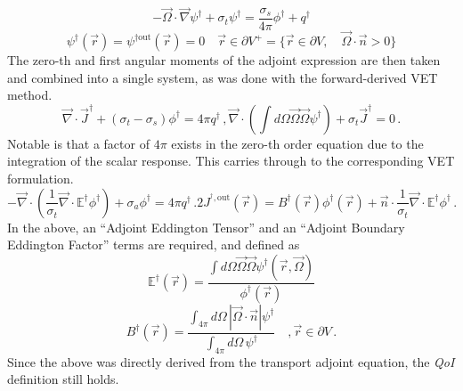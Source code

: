 \documentclass[12pt]{report}
\newcommand{\vr}{\vec{r}}
\newcommand{\vO}{\vec{\Omega}}
\renewcommand{\div}{\vec{\nabla} \cdot}
\newcommand{\grad}{\vec{\nabla}}
\newcommand{\bound}{\partial V}
\newcommand{\vn}{\vec{n}}
\newcommand{\Edd}{\mathbb{E}}
\newcommand{\BEdd}{B}
\newcommand{\sigt}{\sigma_t}
\newcommand{\sigs}{\sigma_s}
\newcommand{\siga}{\sigma_a}
\newcommand{\scalResp}{q^\dag}
\newcommand{\qoi}{{\it QoI}\xspace}
\begin{document}
\begin{equation}
\label{snAdjAlt}
- \vO \cdot \grad \psi^\dag + \sigt \psi^\dag = \frac{\sigs}{4 \pi} \phi^\dag + \scalResp
\end{equation}
%
\begin{equation}
\psi^\dag(\vr) = \psi^{\dag \text{out}}(\vr)=0 \quad \vr \in \partial V^{+} = \{  \vr \in \bound , \quad \vO \cdot \vec{n} > 0 \}
\end{equation}
The zero-th and first angular moments of the adjoint expression are then taken and combined into a single system, as was done with the forward-derived VET method.
\begin{subequations}
\begin{equation}
\label{0amAlt}
\div \vec{J}^\dag + (\sigt-\sigs) \phi^\dag  = 4\pi \scalResp \,,
\end{equation}
\begin{equation}
\label{1amAlt}
\div \left(  \int d\Omega \vO \vO \psi^\dag  \right) + \sigt \vec{J}^\dag  = 0 \,.
\end{equation}
\end{subequations}
%
Notable is that a factor of $4 \pi$ exists in the zero-th order equation due to the integration of the scalar response. This carries through to the corresponding VET formulation.
\begin{subequations}
\begin{equation}
\label{TranAdjVEFForm}
- \div \left( \frac{1}{\sigt}\div \Edd^\dag \phi^\dag  \right) + \siga \phi^\dag  = 4\pi \scalResp  \,.
\end{equation}
\begin{equation}
2 J^{^\dag,\text{out}}(\vr) = \BEdd^\dag(\vr) \phi^\dag(\vr)  + \vn \cdot \frac{1}{\sigt} \div \Edd^\dag  \phi^\dag  \,.
\end{equation}
\end{subequations}
In the above, an ``Adjoint Eddington Tensor'' and an ``Adjoint Boundary Eddington Factor'' terms are required, and defined as
\begin{equation}
\label{AdjEddDef}
\Edd^\dag(\vr)=\frac{\int d\Omega \vO \vO \psi^\dag(\vr,\vO)}{\phi^\dag(\vr)} 
\end{equation} 
\begin{equation}
\BEdd^\dag(\vr) = \frac{\int_{4 \pi} d\Omega \, | \vO \cdot \vn | \psi^\dag}{\int_{4\pi} d\Omega \, \psi^\dag} \quad , \vr \in \bound \,.
\end{equation}
Since the above was directly derived from the transport adjoint equation, the \qoi definition still holds.
\end{document}
